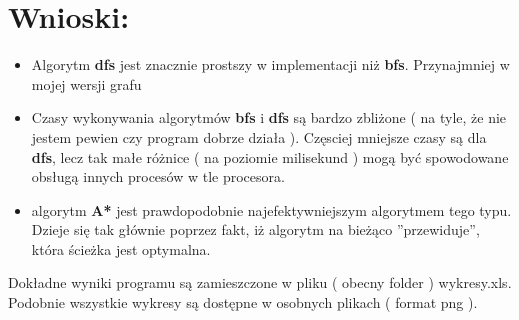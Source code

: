\documentclass[10 pt]{article}
\begin{document}
\section{Wnioski:}
\begin{itemize}
\item Algorytm \textbf{dfs} jest znacznie prostszy w implementacji niż \textbf{bfs}. Przynajmniej w mojej wersji grafu
\item Czasy wykonywania algorytmów \textbf{bfs} i \textbf{dfs} są bardzo zbliżone ( na tyle, że nie jestem pewien czy program dobrze działa ). Częsciej mniejsze czasy są dla \textbf{dfs}, lecz tak małe różnice ( na poziomie milisekund ) mogą być spowodowane obsługą innych procesów w tle procesora.
\item algorytm \textbf{A*} jest prawdopodobnie najefektywniejszym algorytmem tego typu. Dzieje się tak głównie poprzez fakt, iż algorytm na bieżąco ''przewiduje'', która ścieżka jest optymalna.  
\end{itemize}

Dokładne wyniki programu są zamieszczone w pliku ( obecny folder ) wykresy.xls. Podobnie wszystkie wykresy są dostępne w osobnych plikach ( format png ).
\end{document}
